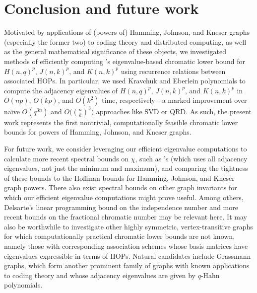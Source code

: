 \documentclass{article}
\numberwithin{equation}{section}
\theoremstyle{plain}
\begin{document}
\section{Conclusion and future work}\label{section:5}

Motivated by applications of (powers of) Hamming, Johnson, and Kneser graphs (especially the former two) to coding theory and distributed computing, as well as the general mathematical significance of these objects, we investigated methods of efficiently computing \cite{Hof03}'s eigenvalue-based chromatic lower bound for $H(n, q)^p$, $J(n, k)^p$, and $K(n, k)^p$ using recurrence relations between associated HOPs. In particular, we used Kravchuk and Eberlein polynomials to compute the adjacency eigenvalues of $H(n, q)^p$, $J(n, k)^p$, and $K(n, k)^p$ in $O(np)$, $O(kp)$, and $O(k^2)$ time, respectively---a marked improvement over na\"ive $O(q^{3n})$ and $O\bigl(\binom{n}{k}^3\bigr)$ approaches like SVD or QRD. As such, the present work represents the first nontrivial, computationally feasible chromatic lower bounds for powers of Hamming, Johnson, and Kneser graphs.

For future work, we consider leveraging our efficient eigenvalue computations to calculate more recent spectral bounds on $\chi$, such as \cite{WE13}'s (which uses all adjacency eigenvalues, not just the minimum and maximum), and comparing the tightness of these bounds to the Hoffman bounds for Hamming, Johnson, and Kneser graph powers. There also exist spectral bounds on other graph invariants for which our efficient eigenvalue computations might prove useful. Among others, Delsarte's linear programming bound on the independence number \cite[p. 31]{Del73} and more recent bounds on the fractional chromatic number \cite{GS24} may be relevant here. It may also be worthwhile to investigate other highly symmetric, vertex-transitive graphs for which computationally practical chromatic lower bounds are not known, namely those with corresponding association schemes whose basis matrices have eigenvalues expressible in terms of HOPs. Natural candidates include Grassmann graphs, which form another prominent family of graphs with known applications to coding theory \cite{Mog22} and whose adjacency eigenvalues are given by $q$-Hahn polynomials.
\end{document}
